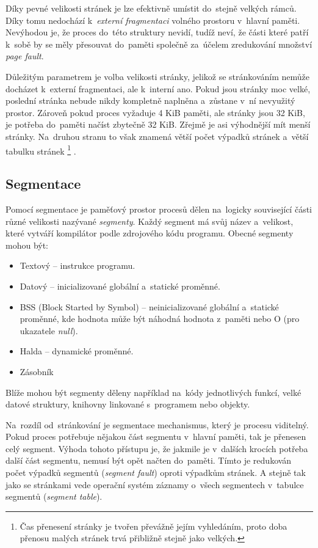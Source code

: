 Díky pevné velikosti stránek je lze efektivně umístit do~stejně velkých rámců. Díky tomu nedochází k~\emph{externí fragmentaci} volného prostoru v~hlavní paměti. Nevýhodou je, že proces do~této struktury nevidí, tudíž neví, že části které patří k~sobě by se měly přesouvat do~paměti společně za~účelem zredukování množství \emph{page fault}.

Důležitým parametrem je volba velikosti stránky, jelikož se stránkováním nemůže docházet k~externí fragmentaci, ale k~interní ano. Pokud jsou stránky moc velké, poslední stránka nebude nikdy kompletně naplněna a~zůstane v~ní nevyužitý prostor. Zároveň pokud proces vyžaduje 4 KiB paměti, ale stránky jsou 32 KiB, je potřeba do~paměti načíst zbytečně 32 KiB. Zřejmě je asi výhodnější mít menší stránky. Na~druhou stranu to však znamená větší počet výpadků stránek a~větší tabulku stránek%
\footnote{Čas přenesení stránky je tvořen převážně jejím vyhledáním, proto doba přenosu malých stránek trvá přibližně stejně jako velkých.}%
.

\subsection{Segmentace}

Pomocí segmentace je paměťový prostor procesů dělen na~logicky související části různé velikosti nazývané \emph{segmenty}. Každý segment má svůj název a~velikost, které vytváří kompilátor podle zdrojového kódu programu. Obecné segmenty mohou být:

\begin{itemize}[noitemsep]
	\item Textový -- instrukce programu.
	\item Datový -- inicializované globální a~statické proměnné.
	\item BSS (Block Started by Symbol) -- neinicializované globální a~statické proměnné, kde hodnota může být náhodná hodnota z~paměti nebo O (pro ukazatele \emph{null}).
	\item Halda -- dynamické proměnné.
	\item Zásobník
\end{itemize}

Blíže mohou být segmenty děleny například na~kódy jednotlivých funkcí, velké datové struktury, knihovny linkované s~programem nebo objekty.

Na~rozdíl od~stránkování je segmentace mechanismus, který je procesu viditelný. Pokud proces potřebuje nějakou část segmentu v~hlavní paměti, tak je přenesen celý segment. Výhoda tohoto přístupu je, že jakmile je v~dalších krocích potřeba další část segmentu, nemusí být opět načten do~paměti. Tímto je redukován počet výpadků segmentů (\emph{segment fault}) oproti výpadkům stránek. A stejně tak jako se stránkami vede operační systém záznamy o~všech segmentech v~tabulce segmentů (\emph{segment table}).

